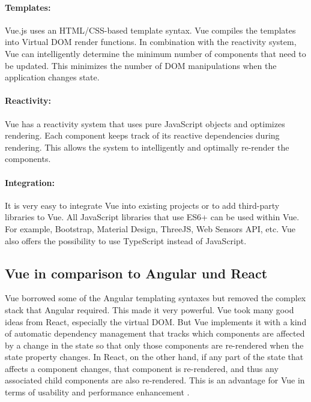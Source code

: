 	\paragraph*{Templates:} Vue.js uses an HTML/\gls{CSS}-based template syntax. Vue compiles the templates into Virtual DOM render functions. In combination with the reactivity system, Vue can intelligently determine the minimum number of components that need to be updated. This minimizes the number of DOM manipulations when the application changes state.
	\paragraph*{Reactivity:} Vue has a reactivity system that uses pure JavaScript objects and optimizes rendering. Each component keeps track of its reactive dependencies during rendering. This allows the system to intelligently and optimally re-render the components.
	\paragraph*{Integration:} It is very easy to integrate Vue into existing projects or to add third-party libraries to Vue. All JavaScript libraries that use ES6+ can be used within Vue. For example, Bootstrap, Material Design, ThreeJS, Web Sensors API, etc.  Vue also offers the possibility to use TypeScript instead of JavaScript.
	\cite{VueGuide:Online}


	\subsection{Vue in comparison to Angular und React}
	\label{sec:VueAngularReact}
	Vue borrowed some of the Angular templating syntaxes but removed the complex stack that Angular required. This made it very powerful. Vue took many good ideas from React, especially the virtual DOM.  But Vue implements it with a kind of automatic dependency management that tracks which components are affected by a change in the state so that only those components are re-rendered when the state property changes. In React, on the other hand, if any part of the state that affects a component changes, that component is re-rendered, and thus any associated child components are also re-rendered. This is an advantage for Vue in terms of usability and performance enhancement \cite{VueComparision:Online}.

